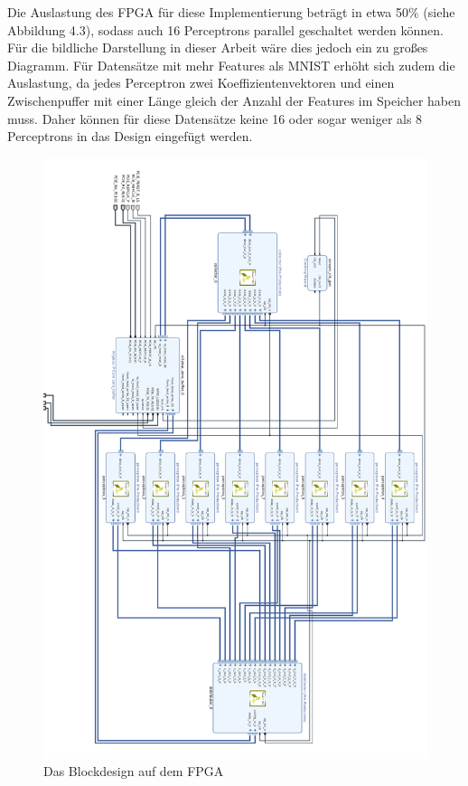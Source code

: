 Die Auslastung des FPGA für diese Implementierung beträgt in etwa 50\% (siehe Abbildung 4.3), sodass auch 16 Perceptrons parallel geschaltet werden können. Für die bildliche Darstellung in dieser Arbeit wäre dies jedoch ein zu großes Diagramm. Für Datensätze mit mehr Features als MNIST erhöht sich zudem die Auslastung, da jedes Perceptron zwei Koeffizientenvektoren und einen Zwischenpuffer mit einer Länge gleich der Anzahl der Features im Speicher haben muss. Daher können für diese Datensätze keine 16 oder sogar weniger als 8 Perceptrons in das Design eingefügt werden.

 \begin{figure}[ht]
\centering
\includegraphics[scale=0.7]{bilder/blockdesign}
\caption{Das Blockdesign auf dem FPGA}
\end{figure}\\
